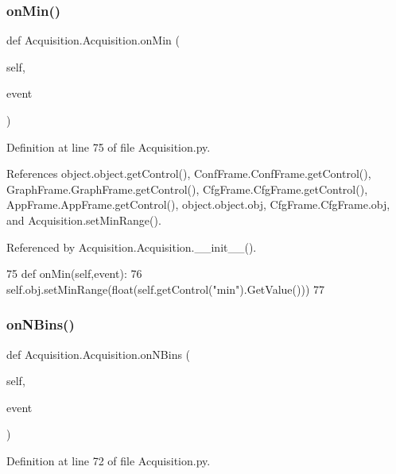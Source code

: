 \subsubsection{\texorpdfstring{on\+Min()}{onMin()}}
{\footnotesize\ttfamily def Acquisition.\+Acquisition.\+on\+Min (\begin{DoxyParamCaption}\item[{}]{self,  }\item[{}]{event }\end{DoxyParamCaption})}



Definition at line 75 of file Acquisition.\+py.



References object.\+object.\+get\+Control(), Conf\+Frame.\+Conf\+Frame.\+get\+Control(), Graph\+Frame.\+Graph\+Frame.\+get\+Control(), Cfg\+Frame.\+Cfg\+Frame.\+get\+Control(), App\+Frame.\+App\+Frame.\+get\+Control(), object.\+object.\+obj, Cfg\+Frame.\+Cfg\+Frame.\+obj, and Acquisition.\+set\+Min\+Range().



Referenced by Acquisition.\+Acquisition.\+\_\+\+\_\+init\+\_\+\+\_\+().


\begin{DoxyCode}
75     \textcolor{keyword}{def }onMin(self,event):
76         self.obj.setMinRange(float(self.getControl(\textcolor{stringliteral}{"min"}).GetValue()))  
77 
\end{DoxyCode}
\mbox{\label{classAcquisition_1_1Acquisition_a59fd4f2c9690f7745f346281ffe4f658}} 
\subsubsection{\texorpdfstring{on\+N\+Bins()}{onNBins()}}
{\footnotesize\ttfamily def Acquisition.\+Acquisition.\+on\+N\+Bins (\begin{DoxyParamCaption}\item[{}]{self,  }\item[{}]{event }\end{DoxyParamCaption})}



Definition at line 72 of file Acquisition.\+py.



